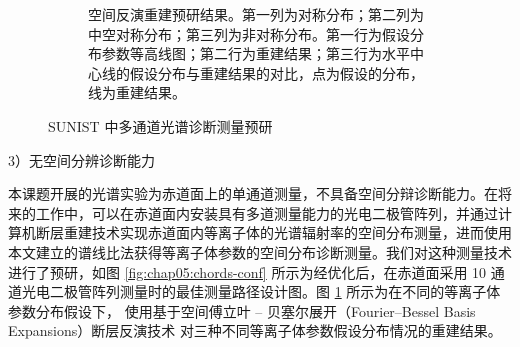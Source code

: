 \begin{figure}
\begin{center}
\begin{subfigure}{0.6\textwidth}
    \caption{空间反演重建预研结果。第一列为对称分布；第二列为中空对称分布；第三列为非对称分布。第一行为假设分布参数等高线图；第二行为重建结果；第三行为水平中心线的假设分布与重建结果的对比，点为假设的分布，线为重建结果。}
    \label{fig:chap05:test-plot}
  \end{subfigure}
\end{center}
  \caption{SUNIST 中多通道光谱诊断测量预研}
  \label{fig:chap05:pda-measuring}
\end{figure}


3）无空间分辨诊断能力

本课题开展的光谱实验为赤道面上的单通道测量，不具备空间分辩诊断能力。在将来的工作中，可以在赤道面内安装具有多道测量能力的光电二极管阵列，并通过计算机断层重建技术实现赤道面内等离子体的光谱辐射率的空间分布测量，进而使用本文建立的谱线比法获得等离子体参数的空间分布诊断测量。我们对这种测量技术进行了预研，如图 \ref{fig:chap05:chords-conf} 所示为经优化后，在赤道面采用 10 通道光电二极管阵列测量时的最佳测量路径设计图。图 \ref{fig:chap05:test-plot} 所示为在不同的等离子体参数分布假设下，
使用基于空间傅立叶 -- 贝塞尔展开（Fourier–Bessel Basis Expansions）断层反演技术
\cite{Cormack1963:1,Cormack1964:2,WangLing1991:RadonTransform,RuanHuailin:Tomography} 对三种不同等离子体参数假设分布情况的重建结果。

